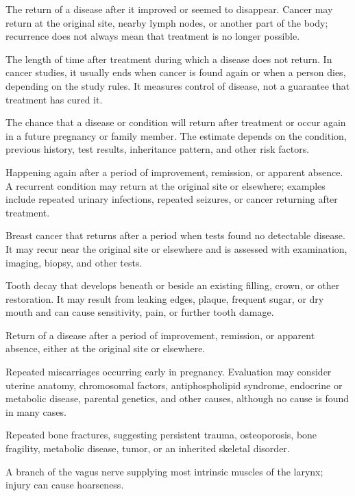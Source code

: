  The return of a disease after it improved or seemed to disappear. Cancer may return at the original site, nearby lymph nodes, or another part of the body; recurrence does not always mean that treatment is no longer possible.

 The length of time after treatment during which a disease does not return. In cancer studies, it usually ends when cancer is found again or when a person dies, depending on the study rules. It measures control of disease, not a guarantee that treatment has cured it.

 The chance that a disease or condition will return after treatment or occur again in a future pregnancy or family member. The estimate depends on the condition, previous history, test results, inheritance pattern, and other risk factors.

 Happening again after a period of improvement, remission, or apparent absence. A recurrent condition may return at the original site or elsewhere; examples include repeated urinary infections, repeated seizures, or cancer returning after treatment.

 Breast cancer that returns after a period when tests found no detectable disease. It may recur near the original site or elsewhere and is assessed with examination, imaging, biopsy, and other tests.

 Tooth decay that develops beneath or beside an existing filling, crown, or other restoration. It may result from leaking edges, plaque, frequent sugar, or dry mouth and can cause sensitivity, pain, or further tooth damage.

 Return of a disease after a period of improvement, remission, or apparent absence, either at the original site or elsewhere.

 Repeated miscarriages occurring early in pregnancy. Evaluation may consider uterine anatomy, chromosomal factors, antiphospholipid syndrome, endocrine or metabolic disease, parental genetics, and other causes, although no cause is found in many cases.

 Repeated bone fractures, suggesting persistent trauma, osteoporosis, bone fragility, metabolic disease, tumor, or an inherited skeletal disorder.

 A branch of the vagus nerve supplying most intrinsic muscles of the larynx; injury can cause hoarseness.


